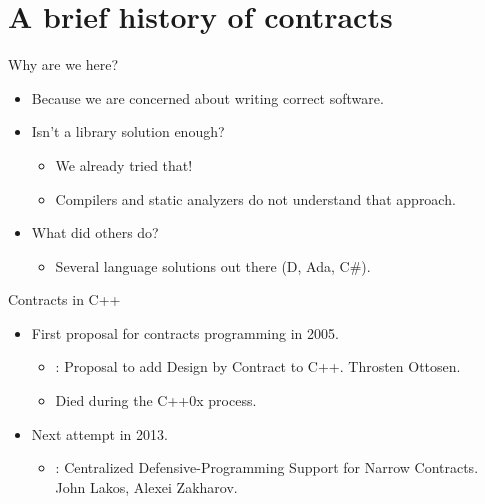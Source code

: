 \section{A brief history of contracts}

\begin{frame}[t,fragile]{Why are we here?}
\begin{itemize}
  \item Because we are concerned about writing correct software.

  \vfill\pause
  \item Isn't a library solution enough?
    \pause
    \begin{itemize}
      \item We already tried that!
      \item Compilers and static analyzers do not understand that approach.
    \end{itemize}

  \vfill\pause
  \item What did others do?
    \pause
    \begin{itemize}
      \item Several language solutions out there (D, Ada, C\#).
    \end{itemize}
\end{itemize}
\end{frame}

\begin{frame}[t]{Contracts in C++}
\begin{itemize}
  \item First proposal for contracts programming in 2005.
    \begin{itemize}
      \item {}: Proposal to add Design by Contract to C++.
            Throsten Ottosen.
      \item Died during the C++0x process.
    \end{itemize}

  \vfill\pause
  \item Next attempt in 2013.
    \begin{itemize}
      \item {}: Centralized Defensive-Programming Support for
Narrow Contracts.
            John Lakos, Alexei Zakharov.
    \end{itemize}
\end{itemize}
\end{frame}

